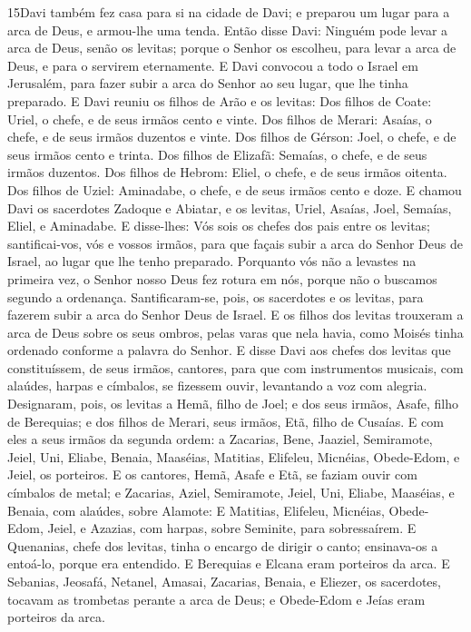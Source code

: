 \lettrine{15} Davi também fez casa para si na cidade de Davi;
e preparou um lugar para a arca de Deus, e armou-lhe uma tenda.
Então disse Davi: Ninguém pode levar a arca de Deus, senão os
levitas; porque o Senhor os escolheu, para levar a arca de Deus, e
para o servirem eternamente. E Davi convocou a todo o Israel em
Jerusalém, para fazer subir a arca do Senhor ao seu lugar, que lhe
tinha preparado. E Davi reuniu os filhos de Arão e os levitas:
Dos filhos de Coate: Uriel, o chefe, e de seus irmãos cento e
vinte. Dos filhos de Merari: Asaías, o chefe, e de seus irmãos
duzentos e vinte. Dos filhos de Gérson: Joel, o chefe, e de seus
irmãos cento e trinta. Dos filhos de Elizafã: Semaías, o chefe,
e de seus irmãos duzentos. Dos filhos de Hebrom: Eliel, o chefe,
e de seus irmãos oitenta. Dos filhos de Uziel: Aminadabe, o
chefe, e de seus irmãos cento e doze. E chamou Davi os
sacerdotes Zadoque e Abiatar, e os levitas, Uriel, Asaías, Joel,
Semaías, Eliel, e Aminadabe. E disse-lhes: Vós sois os chefes
dos pais entre os levitas; santificai-vos, vós e vossos irmãos, para
que façais subir a arca do Senhor Deus de Israel, ao lugar que lhe
tenho preparado. Porquanto vós não a levastes na primeira
vez, o Senhor nosso Deus fez rotura em nós, porque não o buscamos
segundo a ordenança. Santificaram-se, pois, os sacerdotes e
os levitas, para fazerem subir a arca do Senhor Deus de Israel.
E os filhos dos levitas trouxeram a arca de Deus sobre os
seus ombros, pelas varas que nela havia, como Moisés tinha ordenado
conforme a palavra do Senhor. E disse Davi aos chefes dos
levitas que constituíssem, de seus irmãos, cantores, para que com
instrumentos musicais, com alaúdes, harpas e címbalos, se fizessem
ouvir, levantando a voz com alegria. Designaram, pois, os
levitas a Hemã, filho de Joel; e dos seus irmãos, Asafe, filho de
Berequias; e dos filhos de Merari, seus irmãos, Etã, filho de
Cusaías. E com eles a seus irmãos da segunda ordem: a
Zacarias, Bene, Jaaziel, Semiramote, Jeiel, Uni, Eliabe, Benaia,
Maaséias, Matitias, Elifeleu, Micnéias, Obede-Edom, e Jeiel, os
porteiros. E os cantores, Hemã, Asafe e Etã, se faziam ouvir
com címbalos de metal; e Zacarias, Aziel, Semiramote, Jeiel,
Uni, Eliabe, Maaséias, e Benaia, com alaúdes, sobre Alamote:
E Matitias, Elifeleu, Micnéias, Obede-Edom, Jeiel, e Azazias,
com harpas, sobre Seminite, para sobressaírem. E Quenanias,
chefe dos levitas, tinha o encargo de dirigir o canto; ensinava-os a
entoá-lo, porque era entendido. E Berequias e Elcana eram
porteiros da arca. E Sebanias, Jeosafá, Netanel, Amasai,
Zacarias, Benaia, e Eliezer, os sacerdotes, tocavam as trombetas
perante a arca de Deus; e Obede-Edom e Jeías eram porteiros da arca.

